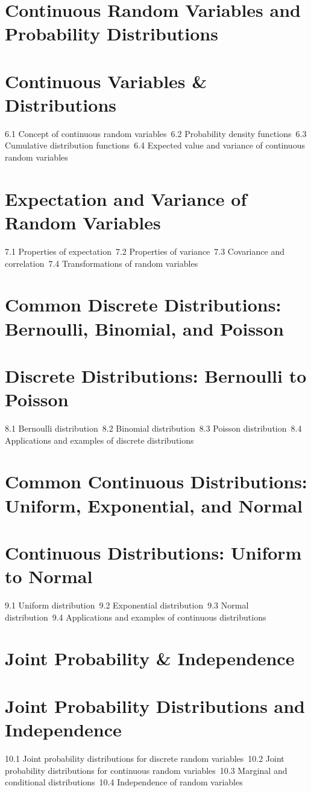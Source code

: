 \section{Continuous Random Variables and Probability Distributions}
\section{Continuous Variables \& Distributions}
6.1 Concept of continuous random variables\
6.2 Probability density functions\
6.3 Cumulative distribution functions\
6.4 Expected value and variance of continuous random variables\
\section{Expectation and Variance of Random Variables}
7.1 Properties of expectation\
7.2 Properties of variance\
7.3 Covariance and correlation\
7.4 Transformations of random variables\
\section{Common Discrete Distributions: Bernoulli, Binomial, and Poisson}
\section{Discrete Distributions: Bernoulli to Poisson}
8.1 Bernoulli distribution\
8.2 Binomial distribution\
8.3 Poisson distribution\
8.4 Applications and examples of discrete distributions\
\section{Common Continuous Distributions: Uniform, Exponential, and Normal}
\section{Continuous Distributions: Uniform to Normal}
9.1 Uniform distribution\
9.2 Exponential distribution\
9.3 Normal distribution\
9.4 Applications and examples of continuous distributions\
\section{Joint Probability \& Independence}
\section{Joint Probability Distributions and Independence}
10.1 Joint probability distributions for discrete random variables\
10.2 Joint probability distributions for continuous random variables\
10.3 Marginal and conditional distributions\
10.4 Independence of random variables\
